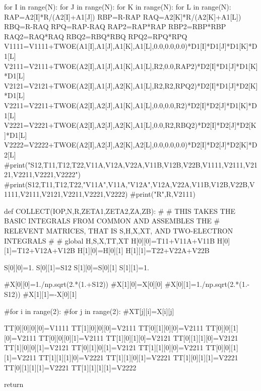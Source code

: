     for I in range(N):
        for J in range(N):
            for K in range(N):
                for L in range(N):
                    RAP=A2[I]*R/(A2[I]+A1[J])
                    RBP=R-RAP
                    RAQ=A2[K]*R/(A2[K]+A1[L])
                    RBQ=R-RAQ
                    RPQ=RAP-RAQ
                    RAP2=RAP*RAP
                    RBP2=RBP*RBP
                    RAQ2=RAQ*RAQ
                    RBQ2=RBQ*RBQ
                    RPQ2=RPQ*RPQ
                    V1111=V1111+TWOE(A1[I],A1[J],A1[K],A1[L],0.0,0.0,0.0)*D1[I]*D1[J]*D1[K]*D1[L]
                    V2111=V2111+TWOE(A2[I],A1[J],A1[K],A1[L],R2,0.0,RAP2)*D2[I]*D1[J]*D1[K]*D1[L]
                    V2121=V2121+TWOE(A2[I],A1[J],A2[K],A1[L],R2,R2,RPQ2)*D2[I]*D1[J]*D2[K]*D1[L]
                    V2211=V2211+TWOE(A2[I],A2[J],A1[K],A1[L],0.0,0.0,R2)*D2[I]*D2[J]*D1[K]*D1[L]
                    V2221=V2221+TWOE(A2[I],A2[J],A2[K],A1[L],0.0,R2,RBQ2)*D2[I]*D2[J]*D2[K]*D1[L]
                    V2222=V2222+TWOE(A2[I],A2[J],A2[K],A2[L],0.0,0.0,0.0)*D2[I]*D2[J]*D2[K]*D2[L]
    #print("S12,T11,T12,T22,V11A,V12A,V22A,V11B,V12B,V22B,V1111,V2111,V2121,V2211,V2221,V2222")                   
    #print(S12,T11,T12,T22,"V11A",V11A,"V12A",V12A,V22A,V11B,V12B,V22B,V1111,V2111,V2121,V2211,V2221,V2222)
    #print("R",R,V2111)
    


def COLLECT(IOP,N,R,ZETA1,ZETA2,ZA,ZB):
#
# THIS TAKES THE BASIC INTEGRALS FROM COMMON AND ASSEMBLES THE
# RELEVENT MATRICES, THAT IS S,H,X,XT, AND TWO-ELECTRON INTEGRALS
#
#
    global H,S,X,TT,XT
    H[0][0]=T11+V11A+V11B
    H[0][1]=T12+V12A+V12B
    H[1][0]=H[0][1]
    H[1][1]=T22+V22A+V22B

    S[0][0]=1.
    S[0][1]=S12
    S[1][0]=S[0][1]
    S[1][1]=1.

    #X[0][0]=1./np.sqrt(2.*(1.+S12))
    #X[1][0]=X[0][0]
    #X[0][1]=1./np.sqrt(2.*(1.-S12))
    #X[1][1]=-X[0][1]
    
    #for i in range(2):
        #for j in range(2):
            #XT[j][i]=X[i][j]

    TT[0][0][0][0]=V1111
    TT[1][0][0][0]=V2111
    TT[0][1][0][0]=V2111
    TT[0][0][1][0]=V2111
    TT[0][0][0][1]=V2111
    TT[1][0][1][0]=V2121
    TT[0][1][1][0]=V2121
    TT[1][0][0][1]=V2121
    TT[0][1][0][1]=V2121
    TT[1][1][0][0]=V2211
    TT[0][0][1][1]=V2211
    TT[1][1][1][0]=V2221
    TT[1][1][0][1]=V2221
    TT[1][0][1][1]=V2221
    TT[0][1][1][1]=V2221
    TT[1][1][1][1]=V2222


    return

